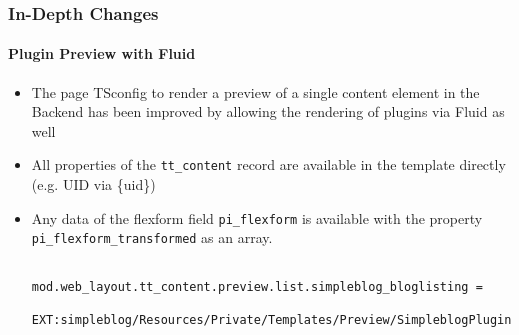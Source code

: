 \begin{frame}[fragile]
	\frametitle{In-Depth Changes}
	\framesubtitle{Plugin Preview with Fluid}

	\lstset{basicstyle=\tiny\ttfamily}

	\begin{itemize}
		\item The page TSconfig to render a preview of a single content element in the Backend has been improved
			by allowing the rendering of plugins via Fluid as well

		\item All properties of the \texttt{tt\_content} record are available in the template directly (e.g. UID via \{uid\})

		\item Any data of the flexform field \texttt{pi\_flexform} is available with the property
			\texttt{pi\_flexform\_transformed} as an array.

			\begin{lstlisting}
				mod.web_layout.tt_content.preview.list.simpleblog_bloglisting =
				  EXT:simpleblog/Resources/Private/Templates/Preview/SimpleblogPlugin.html
			\end{lstlisting}

	\end{itemize}

\end{frame}



